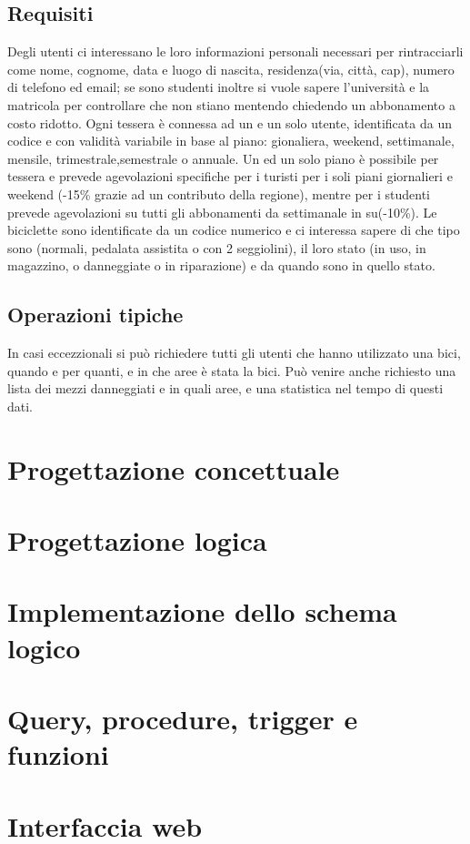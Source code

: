\documentclass[a4paper,twoside]{article}
\begin{document}
\subsection{Requisiti}
Degli utenti ci interessano le loro informazioni personali necessari per rintracciarli come nome, cognome, data e luogo di nascita, residenza(via, città, cap), numero di telefono ed email; se sono studenti inoltre si vuole sapere l'università e la matricola per controllare che non stiano mentendo chiedendo un abbonamento a costo ridotto.\newline
Ogni tessera è connessa ad un e un solo utente, identificata da un codice e con validità variabile in base al piano: gionaliera, weekend, settimanale, mensile, trimestrale,semestrale o annuale. Un ed un solo piano è possibile per tessera e prevede agevolazioni specifiche per i turisti per i soli piani giornalieri e weekend (-15\% grazie ad un contributo della regione), mentre per i studenti prevede agevolazioni su tutti gli abbonamenti da settimanale in su(-10\%).\newline
Le biciclette sono identificate da un codice numerico e ci interessa sapere di che tipo sono (normali, pedalata assistita o con 2 seggiolini), il loro stato (in uso, in magazzino, o danneggiate o in riparazione) e da quando sono in quello stato.

\subsection{Operazioni tipiche}

In casi eccezzionali si può richiedere tutti gli utenti che hanno utilizzato una bici, quando e per quanti, e in che aree è stata la bici. Può venire anche richiesto una lista dei mezzi danneggiati e in quali aree, e una statistica nel tempo di questi dati.

\section{Progettazione concettuale}

\section{Progettazione logica}

\section{Implementazione dello schema logico}

\section{Query, procedure, trigger e funzioni}

\section{Interfaccia web}
\end{document}
